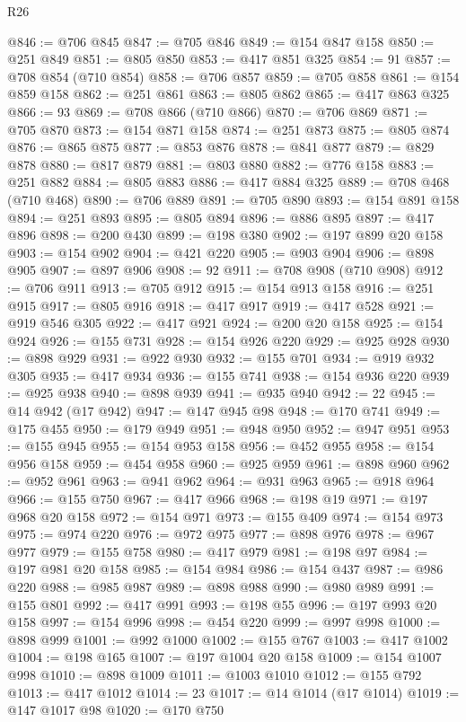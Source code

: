 \begin{lexlean}{R26}
\begin{coremodule}
@846 := @706 @845
@847 := @705 @846
@849 := @154 @847 @158
@850 := @251 @849
@851 := @805 @850
@853 := @417 @851 @325
@854 := 91
@857 := @708 @854 (@710 @854)
@858 := @706 @857
@859 := @705 @858
@861 := @154 @859 @158
@862 := @251 @861
@863 := @805 @862
@865 := @417 @863 @325
@866 := 93
@869 := @708 @866 (@710 @866)
@870 := @706 @869
@871 := @705 @870
@873 := @154 @871 @158
@874 := @251 @873
@875 := @805 @874
@876 := @865 @875
@877 := @853 @876
@878 := @841 @877
@879 := @829 @878
@880 := @817 @879
@881 := @803 @880
@882 := @776 @158
@883 := @251 @882
@884 := @805 @883
@886 := @417 @884 @325
@889 := @708 @468 (@710 @468)
@890 := @706 @889
@891 := @705 @890
@893 := @154 @891 @158
@894 := @251 @893
@895 := @805 @894
@896 := @886 @895
@897 := @417 @896
@898 := @200 @430
@899 := @198 @380
@902 := @197 @899 @20 @158
@903 := @154 @902
@904 := @421 @220
@905 := @903 @904
@906 := @898 @905
@907 := @897 @906
@908 := 92
@911 := @708 @908 (@710 @908)
@912 := @706 @911
@913 := @705 @912
@915 := @154 @913 @158
@916 := @251 @915
@917 := @805 @916
@918 := @417 @917
@919 := @417 @528
@921 := @919 @546 @305
@922 := @417 @921
@924 := @200 @20 @158
@925 := @154 @924
@926 := @155 @731
@928 := @154 @926 @220
@929 := @925 @928
@930 := @898 @929
@931 := @922 @930
@932 := @155 @701
@934 := @919 @932 @305
@935 := @417 @934
@936 := @155 @741
@938 := @154 @936 @220
@939 := @925 @938
@940 := @898 @939
@941 := @935 @940
@942 := 22
@945 := @14 @942 (@17 @942)
@947 := @147 @945 @98
@948 := @170 @741
@949 := @175 @455
@950 := @179 @949
@951 := @948 @950
@952 := @947 @951
@953 := @155 @945
@955 := @154 @953 @158
@956 := @452 @955
@958 := @154 @956 @158
@959 := @454 @958
@960 := @925 @959
@961 := @898 @960
@962 := @952 @961
@963 := @941 @962
@964 := @931 @963
@965 := @918 @964
@966 := @155 @750
@967 := @417 @966
@968 := @198 @19
@971 := @197 @968 @20 @158
@972 := @154 @971
@973 := @155 @409
@974 := @154 @973
@975 := @974 @220
@976 := @972 @975
@977 := @898 @976
@978 := @967 @977
@979 := @155 @758
@980 := @417 @979
@981 := @198 @97
@984 := @197 @981 @20 @158
@985 := @154 @984
@986 := @154 @437
@987 := @986 @220
@988 := @985 @987
@989 := @898 @988
@990 := @980 @989
@991 := @155 @801
@992 := @417 @991
@993 := @198 @55
@996 := @197 @993 @20 @158
@997 := @154 @996
@998 := @454 @220
@999 := @997 @998
@1000 := @898 @999
@1001 := @992 @1000
@1002 := @155 @767
@1003 := @417 @1002
@1004 := @198 @165
@1007 := @197 @1004 @20 @158
@1009 := @154 @1007 @998
@1010 := @898 @1009
@1011 := @1003 @1010
@1012 := @155 @792
@1013 := @417 @1012
@1014 := 23
@1017 := @14 @1014 (@17 @1014)
@1019 := @147 @1017 @98
@1020 := @170 @750

\end{coremodule}
\end{lexlean}
